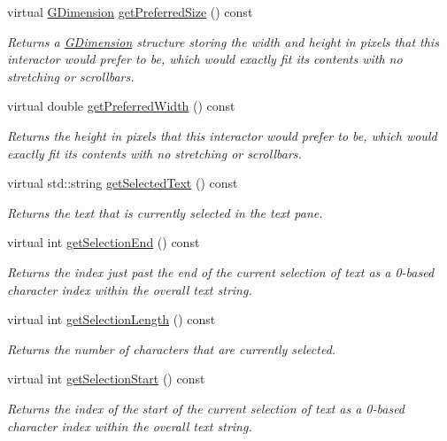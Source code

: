 \begin{DoxyCompactItemize}
virtual \mbox{\hyperlink{classGDimension}{G\+Dimension}} \mbox{\hyperlink{classGInteractor_a4aabbee761d8e9116275401131b7ccd1}{get\+Preferred\+Size}} () const
\begin{DoxyCompactList}\small\item\em Returns a \mbox{\hyperlink{classGDimension}{G\+Dimension}} structure storing the width and height in pixels that this interactor would prefer to be, which would exactly fit its contents with no stretching or scrollbars. \end{DoxyCompactList}\item 
virtual double \mbox{\hyperlink{classGInteractor_a82bca31d37700fb0e35d2743352efd5e}{get\+Preferred\+Width}} () const
\begin{DoxyCompactList}\small\item\em Returns the height in pixels that this interactor would prefer to be, which would exactly fit its contents with no stretching or scrollbars. \end{DoxyCompactList}\item 
virtual std\+::string \mbox{\hyperlink{classGBrowserPane_a512371b3f41599349f23389825a6ccf7}{get\+Selected\+Text}} () const
\begin{DoxyCompactList}\small\item\em Returns the text that is currently selected in the text pane. \end{DoxyCompactList}\item 
virtual int \mbox{\hyperlink{classGBrowserPane_a2885313daa0e367cee2ccd0c704a6147}{get\+Selection\+End}} () const
\begin{DoxyCompactList}\small\item\em Returns the index just past the end of the current selection of text as a 0-\/based character index within the overall text string. \end{DoxyCompactList}\item 
virtual int \mbox{\hyperlink{classGBrowserPane_a68f7816694269b73e6284e756eb0c179}{get\+Selection\+Length}} () const
\begin{DoxyCompactList}\small\item\em Returns the number of characters that are currently selected. \end{DoxyCompactList}\item 
virtual int \mbox{\hyperlink{classGBrowserPane_aad7c986a677c1b9cf445cd7cfb6a8975}{get\+Selection\+Start}} () const
\begin{DoxyCompactList}\small\item\em Returns the index of the start of the current selection of text as a 0-\/based character index within the overall text string. \end{DoxyCompactList}\item 

\end{DoxyCompactItemize}
